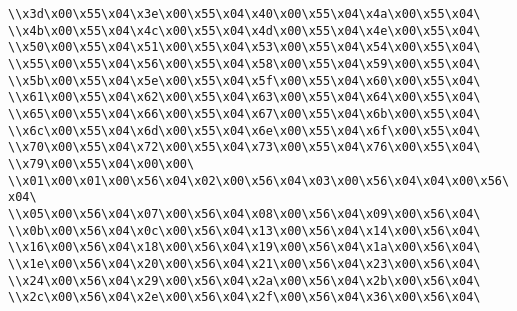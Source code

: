 \verb|\\x3d\x00\x55\x04\x3e\x00\x55\x04\x40\x00\x55\x04\x4a\x00\x55\x04\|\newline
\verb|\\x4b\x00\x55\x04\x4c\x00\x55\x04\x4d\x00\x55\x04\x4e\x00\x55\x04\|\newline
\verb|\\x50\x00\x55\x04\x51\x00\x55\x04\x53\x00\x55\x04\x54\x00\x55\x04\|\newline
\verb|\\x55\x00\x55\x04\x56\x00\x55\x04\x58\x00\x55\x04\x59\x00\x55\x04\|\newline
\verb|\\x5b\x00\x55\x04\x5e\x00\x55\x04\x5f\x00\x55\x04\x60\x00\x55\x04\|\newline
\verb|\\x61\x00\x55\x04\x62\x00\x55\x04\x63\x00\x55\x04\x64\x00\x55\x04\|\newline
\verb|\\x65\x00\x55\x04\x66\x00\x55\x04\x67\x00\x55\x04\x6b\x00\x55\x04\|\newline
\verb|\\x6c\x00\x55\x04\x6d\x00\x55\x04\x6e\x00\x55\x04\x6f\x00\x55\x04\|\newline
\verb|\\x70\x00\x55\x04\x72\x00\x55\x04\x73\x00\x55\x04\x76\x00\x55\x04\|\newline
\verb|\\x79\x00\x55\x04\x00\x00\|\newline
\verb|\\x01\x00\x01\x00\x56\x04\x02\x00\x56\x04\x03\x00\x56\x04\x04\x00\x56\x04\|\newline
\verb|\\x05\x00\x56\x04\x07\x00\x56\x04\x08\x00\x56\x04\x09\x00\x56\x04\|\newline
\verb|\\x0b\x00\x56\x04\x0c\x00\x56\x04\x13\x00\x56\x04\x14\x00\x56\x04\|\newline
\verb|\\x16\x00\x56\x04\x18\x00\x56\x04\x19\x00\x56\x04\x1a\x00\x56\x04\|\newline
\verb|\\x1e\x00\x56\x04\x20\x00\x56\x04\x21\x00\x56\x04\x23\x00\x56\x04\|\newline
\verb|\\x24\x00\x56\x04\x29\x00\x56\x04\x2a\x00\x56\x04\x2b\x00\x56\x04\|\newline
\verb|\\x2c\x00\x56\x04\x2e\x00\x56\x04\x2f\x00\x56\x04\x36\x00\x56\x04\|\newline
